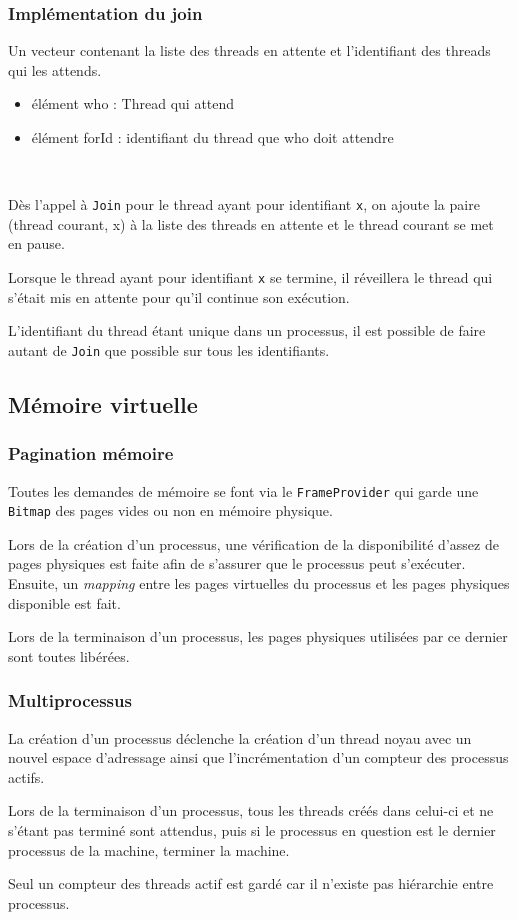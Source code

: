 \documentclass{article}
\begin{document}
		\subsubsection{Implémentation du join}
			Un vecteur contenant la liste des threads en attente et l'identifiant des threads qui les attends.
				\begin{itemize}
					\item élément who : Thread qui attend
					\item élément forId : identifiant du thread que who doit attendre
				\end{itemize}
			~\par{Dès l'appel à \texttt{Join} pour le thread ayant pour identifiant \texttt{x}, on ajoute la paire (thread courant, x) à la liste des threads en attente et le thread courant se met en pause. 
			~\par{Lorsque le thread ayant pour identifiant \texttt{x} se termine, il réveillera le thread qui s'était mis en attente pour qu'il continue son exécution.}
			~\par{L’identifiant du thread étant unique dans un processus, il est possible de faire autant de \texttt{Join} que possible sur tous les identifiants.}

	\subsection{Mémoire virtuelle}
		\subsubsection{Pagination mémoire}
			{Toutes les demandes de mémoire se font via le \texttt{FrameProvider} qui garde une \texttt{Bitmap} des pages vides ou non en mémoire physique.}
			~\par{Lors de la création d'un processus, une vérification de la disponibilité d'assez de pages physiques est faite afin de s'assurer que le processus peut s'exécuter. Ensuite, un \emph{mapping} entre les pages virtuelles du processus et les pages physiques disponible est fait.}
			~\par{Lors de la terminaison d'un processus, les pages physiques utilisées par ce dernier sont toutes libérées.}
		\subsubsection{Multiprocessus}
			{La création d'un processus déclenche la création d'un thread noyau avec un nouvel espace d'adressage ainsi que l'incrémentation d'un compteur des processus actifs.}
			~\par{Lors de la terminaison d'un processus, tous les threads créés dans celui-ci et ne s'étant pas terminé sont attendus, puis si le processus en question est le dernier processus de la machine, terminer la machine.}
			~\par{Seul un compteur des threads actif est gardé car il n'existe pas hiérarchie entre processus.}


}
\end{document}
